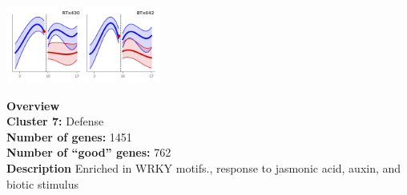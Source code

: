 \begin{multicols}{2}
\includegraphics[width=2in]{figures/clusters/root_Postflowering_6.png}
\columnbreak

\noindent \textbf{Overview}\\\textbf{Cluster 7:} Defense \\
\textbf{Number of genes:} 1451 \\
\textbf{Number of ``good'' genes:} 762 \\
\textbf{Description} Enriched in WRKY motifs., response to jasmonic acid, auxin, and biotic stimulus \\
\end{multicols}

